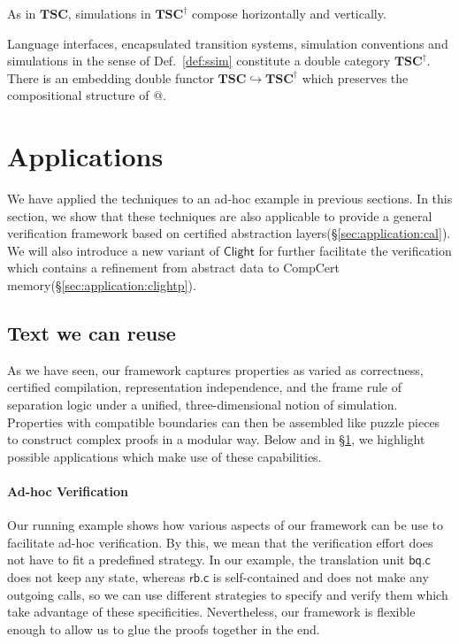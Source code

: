 \documentclass[acmsmall,screen,review,anonymous]{acmart}
\newcommand{\kw}[1]{\ensuremath{ \mathsf{#1} }}
\begin{document}
As in $\mathbf{TSC}$,
simulations in $\mathbf{TSC}^\dagger$ compose
horizontally and vertically.

\begin{theorem} %
Language interfaces, encapsulated transition systems, simulation conventions
and simulations in the sense of Def.~\ref{def:ssim}
constitute a double category $\mathbf{TSC}^\dagger$.
There is an embedding double functor $\mathbf{TSC} \hookrightarrow \mathbf{TSC}^\dagger$
which preserves the compositional structure of $\mathbin@$.
\end{theorem}



\section{Applications} \label{sec:app} %

We have applied the techniques
to an ad-hoc example in previous sections.
In this section,
we show that these techniques are also applicable
to provide a general verification framework
based on certified abstraction layers(\S\ref{sec:application:cal}).
We will also introduce
a new variant of $\kw{Clight}$
for further facilitate
the verification which contains a refinement
from abstract data to CompCert memory(\S\ref{sec:application:clightp}).

\subsection*{Text we can reuse} \label{sec:overview:app} %

As we have seen,
our framework captures
properties as varied as
correctness,
certified compilation,
representation independence, and
the frame rule of separation logic
under a unified, three-dimensional notion of simulation.
Properties with compatible boundaries
can then be assembled like puzzle pieces
to construct complex proofs in a modular way.
Below and in \S\ref{sec:app},
we highlight possible applications
which make use of these capabilities.

\paragraph{Ad-hoc Verification} %

Our running example shows how
various aspects of our framework
can be use to facilitate ad-hoc verification.
By this,
we mean that the verification effort does not have to fit
a predefined strategy.
In our example,
the translation unit $\kw{bq.c}$ does not keep any state,
whereas $\kw{rb.c}$ is self-contained and
does not make any outgoing calls,
so we can use different strategies to specify and verify them
which take advantage of these specificities.
Nevertheless,
our framework is flexible enough to allow us
to glue the proofs together in the end.
\end{document}
